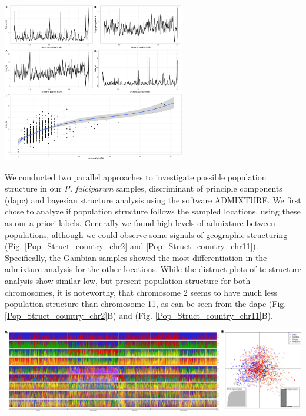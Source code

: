 \documentclass[11pt]{article}
\begin{document}
\begin{center}
\includegraphics[width=0.6\textwidth]{./figures/stats_panel_chr11.png}
\end{center}

We conducted two parallel approaches to investigate possible population structure in our \emph{P. falciparum} samples, discriminant of principle components (dapc) and bayesian structure analysis using the software ADMIXTURE. We first chose to analyze if population structure follows the sampled locations, using these as our a priori labels. Generally we found high levels of admixture between populations, although we could observe some signals of geographic structuring (Fig. \ref{Pop_Struct_country_chr2} and \ref{Pop_Struct_country_chr11}). Specifically, the Gambian samples showed the most differentiation in the admixture analysis for the other locations. While the distruct plots of te structure analysis show similar low, but present population structure for both chromosomes, it is noteworthy, that chromosome 2 seems to have much less population structure than chromosome 11, as can be seen from the dapc (Fig. \ref{Pop_Struct_country_chr2}B) and (Fig. \ref{Pop_Struct_country_chr11}B).

\begin{center}
\includegraphics[width=1\textwidth]{./figures/Population_structure_countries_chr2.png}
\end{center}
\end{document}
